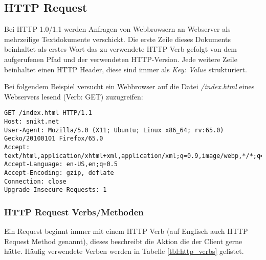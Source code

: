 \subsection{HTTP Request}

Bei HTTP 1.0/1.1 werden Anfragen von Webbrowsern an Webserver als mehrzeilige Textdokumente verschickt. Die erste Zeile dieses Dokuments beinhaltet als erstes Wort das zu verwendete HTTP Verb gefolgt von dem aufgerufenen Pfad und der verwendeten HTTP-Version. Jede weitere Zeile beinhaltet einen HTTP Header, diese sind immer als \textit{Key: Value} strukturiert.

Bei folgendem Beispiel versucht ein Webbrowser auf die Datei \textit{/index.html} eines Webservers lesend (Verb: GET) zuzugreifen:

\begin{verbatim}
GET /index.html HTTP/1.1
Host: snikt.net
User-Agent: Mozilla/5.0 (X11; Ubuntu; Linux x86_64; rv:65.0) Gecko/20100101 Firefox/65.0
Accept: text/html,application/xhtml+xml,application/xml;q=0.9,image/webp,*/*;q=0.8
Accept-Language: en-US,en;q=0.5
Accept-Encoding: gzip, deflate
Connection: close
Upgrade-Insecure-Requests: 1
\end{verbatim}

\subsubsection{HTTP Request Verbs/Methoden}

Ein Request beginnt immer mit einem HTTP Verb (auf Englisch auch HTTP Request Method genannt), dieses beschreibt die Aktion die der Client gerne hätte. Häufig verwendete Verben werden in Tabelle \ref{tbl:http_verbs} gelistet.

